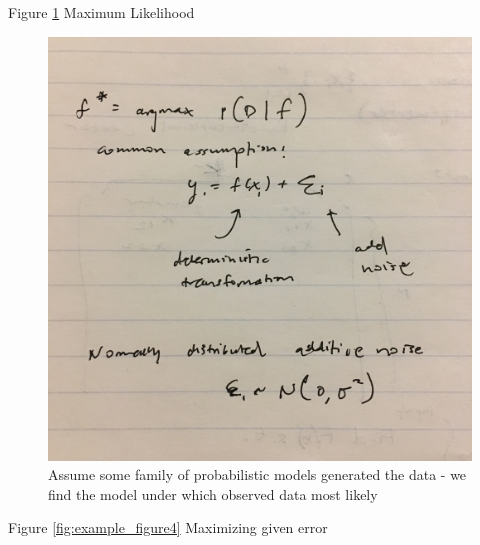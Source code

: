 \pagebreak

Figure \ref{fig:example_figure3} Maximum Likelihood
\begin{figure}[ht]
  \begin{center}
    \includegraphics[width=.9\textwidth,angle=270]{figures/IMG_6642.JPG}
    \caption{
      Assume some family of probabilistic models generated the data - we find the model
      under which observed data most likely}
    \label{fig:example_figure3}
  \end{center}
\end{figure}

\pagebreak

Figure \ref{fig:example_figure4} Maximizing given error


